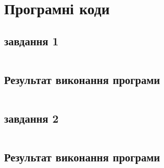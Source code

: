 \section*{Програмні коди}

\subsection*{завдання 1}
\inputminted{c++}{<++>}
\subsection*{Результат виконання програми}
\inputminted{c++}{<++>}

\subsection*{завдання 2}
\inputminted{c++}{<++>}
\subsection*{Результат виконання програми}
\inputminted{c++}{<++>}
